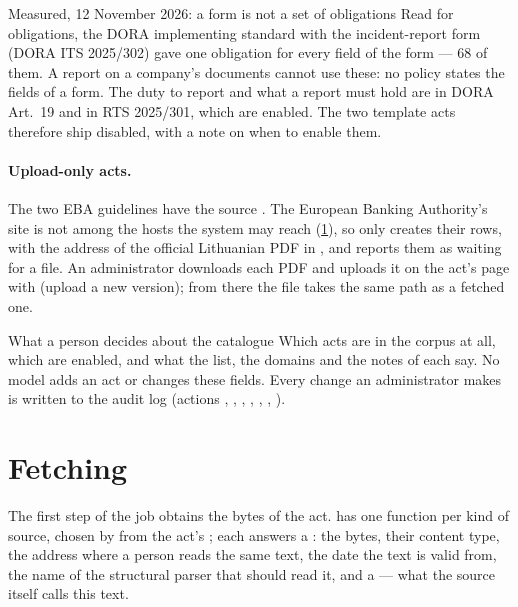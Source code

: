\begin{lessonbox}{Measured, 12 November 2026: a form is not a set of obligations}
Read for obligations, the DORA implementing standard with the incident-report form
(DORA ITS 2025/302) gave one obligation for every field of the form --- 68 of them. A report
on a company's documents cannot use these: no policy states the fields of a form. The duty to
report and what a report must hold are in DORA Art.~19 and in RTS 2025/301, which are enabled.
The two template acts therefore ship disabled, with a note on when to enable them.
\end{lessonbox}

\paragraph{Upload-only acts.} The two EBA guidelines have the source . The
European Banking Authority's site is not among the hosts the system may reach
(\cref{sec:corpus:fetch}), so  only creates their rows, with the address of
the official Lithuanian PDF in , and reports them as waiting for a file. An
administrator downloads each PDF and uploads it on the act's page with
 (upload a new version); from there the file takes the same path
as a fetched one.

\begin{humanbox}{What a person decides about the catalogue}
Which acts are in the corpus at all, which are enabled, and what the  list,
the domains and the notes of each say. No model adds an act or changes these fields. Every
change an administrator makes is written to the audit log (actions ,
, , , ,
, ).
\end{humanbox}


\section{Fetching}\label{sec:corpus:fetch}

The first step of the job obtains the bytes of the act.  has one
function per kind of source, chosen by  from the act's
; each answers a : the bytes, their content type, the
address where a person reads the same text, the date the text is valid from, the name of the
structural parser that should read it, and a  --- what the source itself
calls this text.

